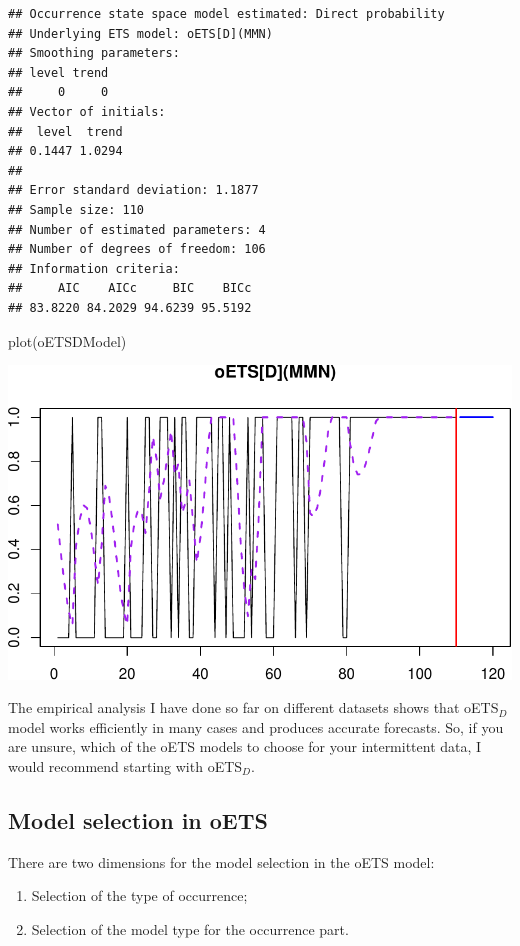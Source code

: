 \documentclass[
]{book}
\newenvironment{Shaded}{\begin{snugshade}}{\end{snugshade}}
\newcommand{\FunctionTok}[1]{\textcolor[rgb]{0.00,0.00,0.00}{#1}}
\newcommand{\NormalTok}[1]{#1}
\providecommand{\tightlist}{%
  \setlength{\itemsep}{0pt}\setlength{\parskip}{0pt}}
\theoremstyle{definition}
\theoremstyle{definition}
\theoremstyle{definition}
\theoremstyle{definition}
\theoremstyle{remark}
\begin{document}
\begin{verbatim}
## Occurrence state space model estimated: Direct probability
## Underlying ETS model: oETS[D](MMN)
## Smoothing parameters:
## level trend 
##     0     0 
## Vector of initials:
##  level  trend 
## 0.1447 1.0294 
## 
## Error standard deviation: 1.1877
## Sample size: 110
## Number of estimated parameters: 4
## Number of degrees of freedom: 106
## Information criteria: 
##     AIC    AICc     BIC    BICc 
## 83.8220 84.2029 94.6239 95.5192
\end{verbatim}

\begin{Shaded}
\begin{Highlighting}[]
\FunctionTok{plot}\NormalTok{(oETSDModel)}
\end{Highlighting}
\end{Shaded}

\includegraphics{adam_files/figure-latex/oETSDExample1-1.pdf}

The empirical analysis I have done so far on different datasets shows that oETS\(_D\) model works efficiently in many cases and produces accurate forecasts. So, if you are unsure, which of the oETS models to choose for your intermittent data, I would recommend starting with oETS\(_D\).

\hypertarget{oETSModelSelection}{%
\subsection{Model selection in oETS}\label{oETSModelSelection}}

There are two dimensions for the model selection in the oETS model:

\begin{enumerate}
\def\labelenumi{\arabic{enumi}.}
\tightlist
\item
  Selection of the type of occurrence;
\item
  Selection of the model type for the occurrence part.
\end{enumerate}
\end{document}
